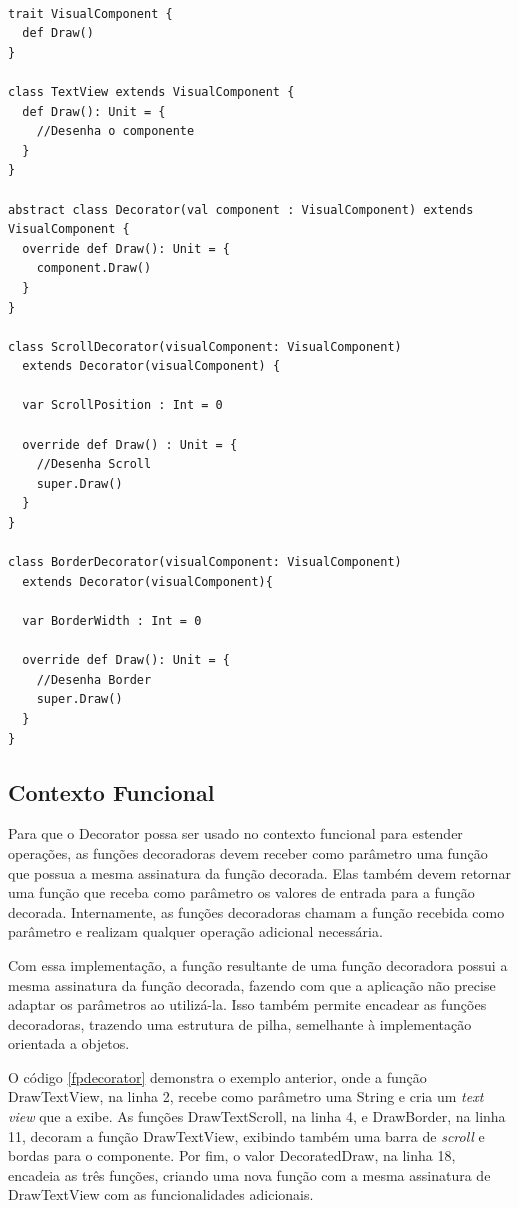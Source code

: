 \begin{lstlisting}[caption={Decorator Orientado a Objetos},label=oodecorator]

trait VisualComponent {
  def Draw()
}

class TextView extends VisualComponent {
  def Draw(): Unit = {
    //Desenha o componente
  }
}

abstract class Decorator(val component : VisualComponent) extends VisualComponent {
  override def Draw(): Unit = {
    component.Draw()
  }
}

class ScrollDecorator(visualComponent: VisualComponent)
  extends Decorator(visualComponent) {

  var ScrollPosition : Int = 0

  override def Draw() : Unit = {
    //Desenha Scroll
    super.Draw()
  }
}

class BorderDecorator(visualComponent: VisualComponent)
  extends Decorator(visualComponent){

  var BorderWidth : Int = 0

  override def Draw(): Unit = {
    //Desenha Border
    super.Draw()
  }
}

\end{lstlisting}

\subsection*{Contexto Funcional}

Para que o Decorator possa ser usado no contexto 
funcional para estender operações, as funções 
decoradoras devem receber como parâmetro uma função 
que possua a mesma assinatura da função decorada. 
Elas também devem retornar uma função que receba 
como parâmetro os valores de entrada para a 
função decorada. Internamente, as funções decoradoras 
chamam a função recebida como parâmetro e realizam 
qualquer operação adicional necessária. 

Com essa implementação, a função resultante de uma 
função decoradora possui a mesma assinatura da função 
decorada, fazendo com que a aplicação não precise adaptar 
os parâmetros ao utilizá-la. Isso também permite 
encadear as funções decoradoras, trazendo uma estrutura de 
pilha, semelhante à implementação orientada a objetos.

O código \ref{fpdecorator} demonstra o exemplo anterior, onde 
a função DrawTextView, na linha 2, recebe como parâmetro uma 
String e cria um \textit{text view} que a exibe. As funções 
DrawTextScroll, na linha 4, e DrawBorder, na linha 11, decoram 
a função DrawTextView, exibindo também uma barra de \textit{scroll} 
e bordas para o componente. Por fim, o valor DecoratedDraw, na 
linha 18, encadeia as três funções, criando uma nova função 
com a mesma assinatura de DrawTextView com as funcionalidades 
adicionais.

